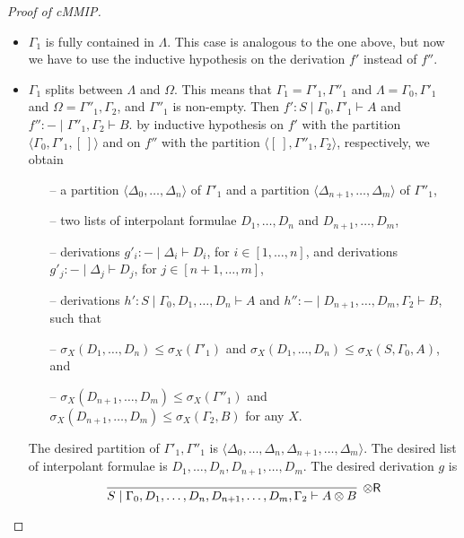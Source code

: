 \documentclass[sn-mathphys-num]{sn-jnl}%
\newcommand{\GG}{\Gamma}
\newcommand{\GD}{\Delta}
\newcommand{\GL}{\Lambda}
\newcommand{\GO}{\Omega}
\newcommand{\vd}{\vdash}
\newcommand{\tr}{\otimes\mathsf{R}}
\newcommand{\ot}{\otimes}
\newcommand{\gs}[1]{\sigma_{X} (#1)}
\newcommand{\cMMIP}{\textsf{cMMIP}}
\theoremstyle{thmstyleone}%
\theoremstyle{thmstyletwo}%
\theoremstyle{thmstylethree}%
\begin{document}
\begin{proof}[Proof of \cMMIP]
\begin{itemize}
    The desired partition of $\GG_1$ is $\langle \GD_0, \dots , \GD_n \rangle$. The desired list of interpolant formulae is $D_1,\dots,D_n$.
    The desired derivation $g_i$ is $g''_i$ for $i \in [1,\dots , n]$ and the desired derivation $h$ is $\tr (f' , h'')$.
    The variable multiplicity condition is satisfied because $\gs{D_1, \dots, D_n} \leq \gs{ \GG'_0 , \GG_2 , B} \leq \gs{S, \GL, \GG'_0 , \GG_2 , A \ot B}$ for any $X$.
    \item $\GG_1$ is fully contained in $\GL$. This case is analogous to the one above, but now we have to use the inductive hypothesis on the derivation $f'$ instead of $f''$.
    \item $\GG_1$ splits between $\GL$ and $\GO$.
    This means that $\GG_1 = \GG'_1 , \GG''_1$ and $\GL = \GG_0 , \GG'_1$ and $\GO = \GG''_1 , \GG_2$, and $\GG''_1$ is non-empty.
    Then $f' : S \mid \GG_0,\GG'_1 \vd A$ and $f'' : {-} \mid \GG''_1,\GG_2 \vd B$.
    by inductive hypothesis on $f'$ with the partition $\langle \GG_0, \GG'_1,[\ ] \rangle$ and on $f''$ with the partition $\langle [\ ],\GG''_1,\GG_2 \rangle$, respectively, we obtain
    \begin{itemize}
      \item[--] a partition $\langle \GD_0, \dots , \GD_n \rangle$ of $\GG'_1$ and a partition $\langle \GD_{n+1}, \dots , \GD_m \rangle$ of $\GG''_1$,
      \item[--] two lists of interpolant formulae $D_1, \dots , D_n$ and $D_{n+1}, \dots , D_m$,
      \item[--] derivations $g'_i : {-} \mid \GD_i \vd D_i$, for $i \in [1,\dots , n]$, and derivations $g'_j : {-} \mid \GD_j \vd D_j$, for $j \in [n+1,\dots , m]$,
      \item[--] derivations $h' : S \mid \GG_0 , D_1 , \dots , D_n \vd A$ and $h'' : {-} \mid D_{n+1} , \dots , D_{m} , \GG_2 \vd B$, such that
      \item[--] $\gs{D_1, \dots, D_n} \leq \gs{\GG'_1}$ and $\gs{D_1, \dots, D_n} \leq \gs{ S, \GG_0 , A}$, and  
      \item[--] $\gs{D_{n+1}, \dots, D_m} \leq \gs{\GG''_1}$ and $\gs{D_{n+1}, \dots, D_m} \leq \gs{\GG_2 , B}$ for any $X$.
    \end{itemize}
    The desired partition of $\GG'_1,\GG''_1$ is $\langle \GD_0, \dots , \GD_n, \GD_{n+1}, \dots , \GD_m \rangle$.
    The desired list of interpolant formulae is $D_1, \dots , D_n,D_{n+1}, \dots , D_m$.
    The desired derivation $g$ is
    \begin{displaymath}
      \infer[\tr]{S \mid \GG_0 , D_1 , \dots , D_n , D_{n+1} , \dots , D_{m}, \GG_2 \vd A \ot B}{
}
\end{displaymath}
\end{itemize}
\end{proof}
\end{document}
